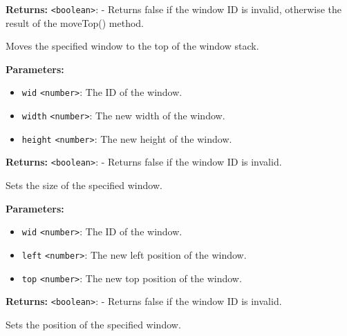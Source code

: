 \documentclass[12pt,a4paper]{article}
\begin{document}
\noindent \textbf{Returns:} \texttt{<boolean>}: - Returns false if the window ID is invalid, otherwise the result of the moveTop() method.

\noindent Moves the specified window to the top of the window stack.

\vspace{5mm}
\noindent {}


\noindent \textbf{Parameters:}
\begin{itemize}
  \item \texttt{wid} \texttt{<number>}: The ID of the window.
  \item \texttt{width} \texttt{<number>}: The new width of the window.
  \item \texttt{height} \texttt{<number>}: The new height of the window.
\end{itemize}

\noindent \textbf{Returns:} \texttt{<boolean>}: - Returns false if the window ID is invalid.

\noindent Sets the size of the specified window.

\vspace{5mm}
\noindent {}


\noindent \textbf{Parameters:}
\begin{itemize}
  \item \texttt{wid} \texttt{<number>}: The ID of the window.
  \item \texttt{left} \texttt{<number>}: The new left position of the window.
  \item \texttt{top} \texttt{<number>}: The new top position of the window.
\end{itemize}

\noindent \textbf{Returns:} \texttt{<boolean>}: - Returns false if the window ID is invalid.

\noindent Sets the position of the specified window.

\vspace{5mm}
\noindent {}
\end{document}
